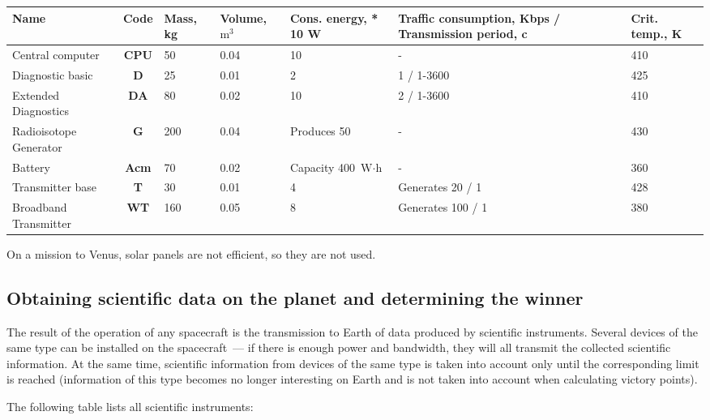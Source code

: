 \documentclass[12pt,a4paper]{article}
\begin{document}
\begin{center}
\begin{tabular}{ |p{3cm}|c|p{1.5cm}|p{1.5cm}|p{2.5cm}|p{3cm}|p{1.5cm}| }
  \hline
  \textbf{Name} & \textbf{Code} & \textbf{Mass, kg} & \textbf{Volume, $\text{m}^3$} &
   \textbf{Cons. energy, * 10 W} & \textbf{Traffic consumption, Kbps / Transmission period,
     c} & \textbf{Crit. temp., K}\\
   \hline
   Central computer & \textbf{CPU} & 50 & 0.04 & 10 & - & 410 \\
   \hline
   Diagnostic basic & \textbf{D} & 25 & 0.01 & 2 & 1 / 1-3600 & 425 \\
   \hline
   Extended Diagnostics & \textbf{DA} & 80 & 0.02 & 10 & 2 / 1-3600 & 410\\
   \hline
   Radioisotope Generator & \textbf{G} & 200 & 0.04 & Produces 50 & - & 430\\
   \hline
   Battery & \textbf{Acm} & 70 & 0.02 & Capacity 400 $\text{W}\cdot\text{h}$& - & 360\\
   \hline
   Transmitter base & \textbf{T} & 30 & 0.01 & 4 & Generates 20 / 1 & 428\\
   \hline
   Broadband Transmitter & \textbf{WT} & 160 & 0.05 & 8 & Generates 100 / 1 & 380\\
   \hline
\end{tabular}
\end{center}

On a mission to Venus, solar panels are not efficient, so they are not used.

\subsection{Obtaining scientific data on the planet and determining the winner}

The result of the operation of any spacecraft is the transmission to Earth of data produced by scientific instruments. Several devices of the same type can be installed on the spacecraft~--- if there is enough power and bandwidth, they will all transmit the collected scientific information. At the same time, scientific information from devices of the same type is taken into account only until the corresponding limit is reached (information of this type becomes no longer interesting on Earth and is not taken into account when calculating victory points).

The following table lists all scientific instruments:
\end{document}
